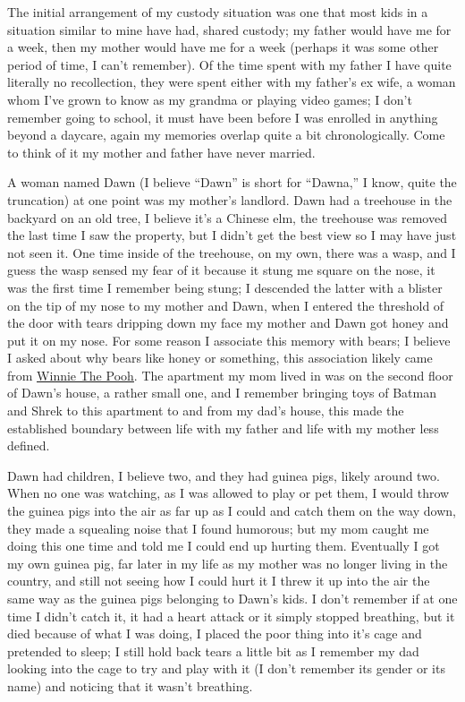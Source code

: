 \documentclass[12pt]{article}
\begin{document}
The initial arrangement of my custody situation was one that most kids in a
situation similar to mine have had, shared custody; my father would have me for
a week, then my mother would have me for a week (perhaps it was some other
period of time, I can't remember).  Of the time spent with my father I have
quite literally no recollection, they were spent either with my father's ex
wife, a woman whom I've grown to know as my grandma or playing video games; I
don't remember going to school, it must have been before I was enrolled in
anything beyond a daycare, again my memories overlap quite a bit
chronologically.  Come to think of it my mother and father have never married.

A woman named Dawn (I believe ``Dawn'' is short for ``Dawna,'' I know, quite
the truncation) at one point was my mother's landlord.  Dawn had a treehouse in
the backyard on an old tree, I believe it's a Chinese elm, the treehouse was
removed the last time I saw the property, but I didn't get the best view so I
may have just not seen it.  One time inside of the treehouse, on my own, there
was a wasp, and I guess the wasp sensed my fear of it because it stung me
square on the nose, it was the first time I remember being stung; I descended
the latter with a blister on the tip of my nose to my mother and Dawn, when I
entered the threshold of the door with tears dripping down my face my mother
and Dawn got honey and put it on my nose.  For some reason I associate this
memory with bears; I believe I asked about why bears like honey or something,
this association likely came from
{\color{blue}\underline{\href{https://winniethepooh.disney.com/}{Winnie The
Pooh}}}.  The apartment my mom lived in was on the second floor of Dawn's
house, a rather small one, and I remember bringing toys of Batman and Shrek to
this apartment to and from my dad's house, this made the established boundary
between life with my father and life with my mother less defined.

Dawn had children, I believe two, and they had guinea pigs, likely around two.
When no one was watching, as I was allowed to play or pet them, I would throw
the guinea pigs into the air as far up as I could and catch them on the way
down, they made a squealing noise that I found humorous; but my mom caught me
doing this one time and told me I could end up hurting them.  Eventually I got
my own guinea pig, far later in my life as my mother was no longer living in
the country, and still not seeing how I could hurt it I threw it up into the
air the same way as the guinea pigs belonging to Dawn's kids.  I don't remember
if at one time I didn't catch it, it had a heart attack or it simply stopped
breathing, but it died because of what I was doing, I placed the poor thing
into it's cage and pretended to sleep; I still hold back tears a little bit as
I remember my dad looking into the cage to try and play with it (I don't
remember its gender or its name) and noticing that it wasn't breathing.
\end{document}

